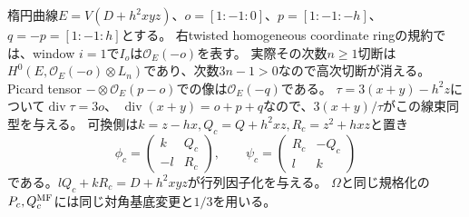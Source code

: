 楕円曲線$E=V(D+h^2xyz)$、$o=[1:-1:0]$、$p=[1:-1:-h]$、$q=-p=[1:-1:h]$とする。
右twisted homogeneous coordinate ringの規約では、window $i=1$で$I_o$は$\mathcal O_E(-o)$を表す。
実際その次数$n\ge1$切断は$H^0(E,\mathcal O_E(-o)\otimes L_n)$であり、次数$3n-1>0$なので高次切断が消える。
Picard tensor $-\otimes\mathcal O_E(p-o)$での像は$\mathcal O_E(-q)$である。
$\tau=3(x+y)-h^2z$について$\operatorname{div}\tau=3o$、
$\operatorname{div}(x+y)=o+p+q$なので、$3(x+y)/\tau$がこの線束同型を与える。
可換側は$k=z-hx,Q_c=Q+h^2xz,R_c=z^2+hxz$と置き
\[
 \phi_c=\begin{pmatrix}k&Q_c\\-l&R_c\end{pmatrix},\qquad
 \psi_c=\begin{pmatrix}R_c&-Q_c\\l&k\end{pmatrix}
\]
である。$lQ_c+kR_c=D+h^2xyz$が行列因子化を与える。
$\Omega$と同じ規格化の$P_c,Q_c^{\rm MF}$には同じ対角基底変更と$1/3$を用いる。

